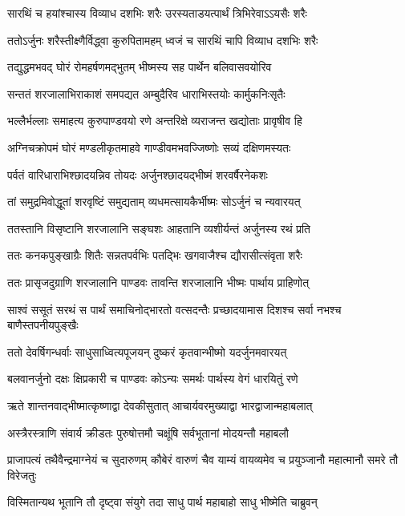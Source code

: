 \twolineshloka
{सारथिं च हयांश्चास्य विव्याध दशभिः शरैः}
{उरस्यताडयत्पार्थं त्रिभिरेवाऽऽयसैः शरैः}


\twolineshloka
{ततोऽर्जुनः शरैस्तीक्ष्णैर्विद्ध्वा कुरुपितामहम्}
{ध्वजं च सारथिं चापि विव्याध दशभिः शरैः}


\twolineshloka
{तद्युद्धमभवद् घोरं रोमहर्षणमद्भुतम्}
{भीष्मस्य सह पार्थेन बलिवासवयोरिव}


\twolineshloka
{सन्ततं शरजालाभिराकाशं समपद्यत}
{अम्बुदैरिव धाराभिस्तयोः कार्मुकनिःसृतैः}


\twolineshloka
{भल्लैर्भल्लाः समाहत्य कुरुपाण्डवयो रणे}
{अन्तरिक्षे व्यराजन्त खद्योताः प्रावृषीव हि}


\twolineshloka
{अग्निचक्रोपमं घोरं मण्डलीकृतमाहवे}
{गाण्डीवमभवज्जिष्णोः सव्यं दक्षिणमस्यतः}


\twolineshloka
{पर्वतं वारिधाराभिश्छादयन्निव तोयदः}
{अर्जुनश्छादयद्भीष्मं शरवर्षैरनेकशः}


\twolineshloka
{तां समुद्रमिवोद्धूतां शरवृष्टिं समुद्यताम्}
{व्यधमत्सायकैर्भीष्मः सोऽर्जुनं च न्यवारयत्}


\twolineshloka
{ततस्तानि विसृष्टानि शरजालानि सङ्घशः}
{आहतानि व्यशीर्यन्तं अर्जुनस्य रथं प्रति}


\twolineshloka
{ततः कनकपुङ्खाग्रैः शितैः सन्नतपर्वभिः}
{पतद्भिः खगवाजैश्च द्यौरासीत्संवृता शरैः}


\twolineshloka
{ततः प्रासृजदुग्राणि शरजालानि पाण्डवः}
{तावन्ति शरजालानि भीष्मः पार्थाय प्राहिणोत्}


\fourlineindentedshloka
{साश्वं ससूतं सरथं स पार्थं}
{समाचिनोद्भारतो वत्सदन्तैः}
{प्रच्छादयामास दिशश्च सर्वा}
{नभश्च बाणैस्तपनीयपुङ्खैः}


\twolineshloka
{ततो देवर्षिगन्धर्वाः साधुसाध्वित्यपूजयन्}
{दुष्करं कृतवान्भीष्मो यदर्जुनमवारयत्}


\twolineshloka
{बलवानर्जुनो दक्षः क्षिप्रकारी च पाण्डवः}
{कोऽन्यः समर्थः पार्थस्य वेगं धारयितुं रणे}


\twolineshloka
{ऋते शान्तनवाद्भीष्मात्कृष्णाद्वा देवकीसुतात्}
{आचार्यवरमुख्याद्वा भारद्वाजान्महाबलात्}


\twolineshloka
{अस्त्रैरस्त्राणि संवार्य क्रीडतः पुरुषोत्तमौ}
{चक्षूंषि सर्वभूतानां मोदयन्तौ महाबलौ}


\threelineshloka
{प्राजापत्यं तथैवैन्द्रमाग्नेयं च सुदारुणम्}
{कौबेरं वारुणं चैव याम्यं वायव्यमेव च}
{प्रयुञ्जानौ महात्मानौ समरे तौ विरेजतुः}


\twolineshloka
{विस्मितान्यथ भूतानि तौ दृष्ट्वा संयुगे तदा}
{साधु पार्थ महाबाहो साधु भीष्मेति चाब्रुवन्}


